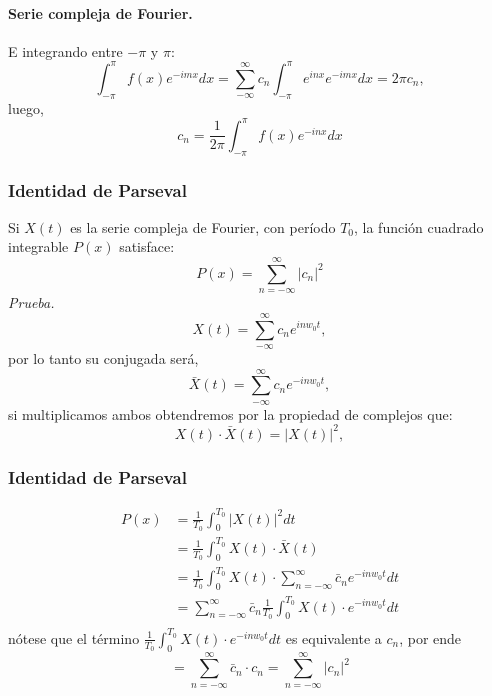 \documentclass{beamer}
\begin{document}
	\begin{frame}
	\framesubtitle{Serie compleja de Fourier.}
	E integrando entre $-\pi$ y $\pi$:
	$$\int^{\pi}_{-\pi} f(x)e^{-imx} dx= \sum_{-\infty}^{\infty} c_n \int^{\pi}_{-\pi}e^{inx} e^{-imx} dx = 2\pi c_n,$$
	luego,
	$$c_n = \frac{1}{2\pi}\int_{-\pi}^{\pi} f(x) e^{-inx} dx$$
	\end{frame}
	\begin{frame}
	\frametitle{Identidad de Parseval}
	Si $X(t)$ es la serie compleja de Fourier, con período $T_0$, la función cuadrado integrable $P(x)$ satisface:
	$$P(x) = \sum_{n=-\infty}^{\infty} |c_n|^2$$
	\textit{Prueba.} 
	$$X(t) = \sum_{-\infty}^{\infty} c_n e^{inw_0t},$$
	por lo tanto su conjugada será,
	$$\bar{X}(t) = \sum_{-\infty}^{\infty} c_n e^{-inw_0t},$$
	si multiplicamos ambos obtendremos por la propiedad de complejos que:
	$$X(t)\cdot\bar{X}(t) = |X(t)|^2,$$
	\end{frame}
	\begin{frame}
	\frametitle{Identidad de Parseval}
	\begin{align*}
		P(x) &= \frac{1}{T_0} \int_{0}^{T_0} |X(t)|^2 dt\\
		&= \frac{1}{T_0} \int_{0}^{T_0} X(t)\cdot\bar{X}(t)\\
		&= \frac{1}{T_0} \int_{0}^{T_0} X(t)\cdot\sum_{n=-\infty}^{\infty} \bar{c}_n e^{-inw_0t} dt\\
		&= \sum_{n=-\infty}^{\infty} \bar{c}_n \frac{1}{T_0} \int_{0}^{T_0} X(t)\cdot e^{-inw_0t} dt\\
	\end{align*}
	nótese que el término $\frac{1}{T_0} \int_{0}^{T_0} X(t)\cdot e^{-inw_0t} dt$ es equivalente a $c_n$, por ende
	$$ =  \sum_{n=-\infty}^{\infty} \bar{c}_n \cdot c_n = \sum_{n=-\infty}^{\infty} |c_n|^2$$
	\end{frame}
\end{document}
